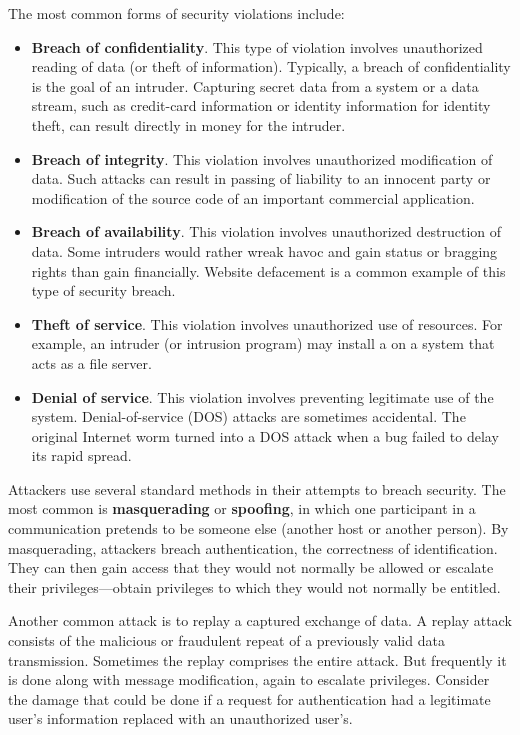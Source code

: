 The most common forms of security violations include:
\begin{itemize}[noitemsep]
\item \textbf{Breach of confidentiality}.
  This type of violation involves unauthorized reading of data (or theft of information).
  Typically, a breach of confidentiality is the goal of an intruder.
  Capturing secret data from a system or a data stream, such as credit-card information or identity information for identity theft, can result directly in money for the intruder.
\item \textbf{Breach of integrity}.
  This violation involves unauthorized modification of data.
  Such attacks can result in passing of liability to an innocent party or modification of the source code of an important commercial application.
\item \textbf{Breach of availability}.
  This violation involves unauthorized destruction of data.
  Some intruders would rather wreak havoc and gain status or bragging rights than gain financially.
  Website defacement is a common example of this type of security breach.
\item \textbf{Theft of service}.
  This violation involves unauthorized use of resources.
  For example, an intruder (or intrusion program) may install a  on a system that acts as a file server.
\item \textbf{Denial of service}.
  This violation involves preventing legitimate use of the system.
  Denial-of-service (DOS) attacks are sometimes accidental.
  The original Internet worm turned into a DOS attack when a bug failed to delay its rapid spread.
\end{itemize}

Attackers use several standard methods in their attempts to breach security.
The most common is \textbf{masquerading} or \textbf{spoofing}, in which one participant in a communication pretends to be someone else (another host or another person).
By masquerading, attackers breach authentication, the correctness of identification.
They can then gain access that they would not normally be allowed or escalate their privileges—obtain privileges to which they would not normally be entitled.

Another common attack is to replay a captured exchange of data.
A replay attack consists of the malicious or fraudulent repeat of a previously valid data transmission.
Sometimes the replay comprises the entire attack.
But frequently it is done along with message modification, again to escalate privileges.
Consider the damage that could be done if a request for authentication had a legitimate user’s information replaced with an unauthorized user’s.

